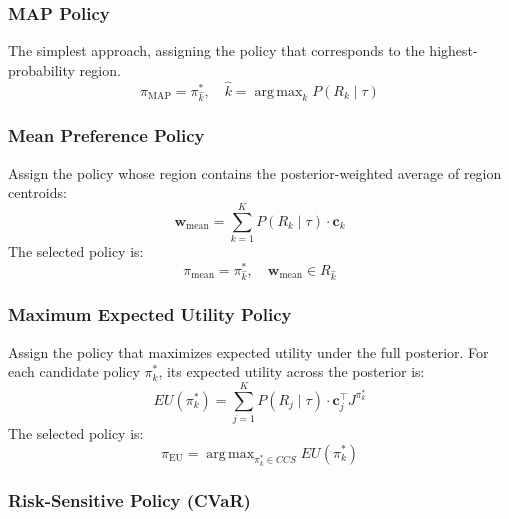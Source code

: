 \documentclass[11pt]{article}
\DeclareMathOperator*{\argmax}{arg\,max}
\begin{document}

\subsubsection{MAP Policy}
 
The simplest approach, assigning the policy that corresponds to the highest-probability region.
\begin{equation}
    \pi_{\text{MAP}} = \pi^*_{\hat{k}}, \quad \hat{k} = \argmax_k P(R_k \mid \tau)
\end{equation}

\subsubsection{Mean Preference Policy}

Assign the policy whose region contains the posterior-weighted average of region centroids:
\begin{equation}
    \mathbf{w}_{\text{mean}} = \sum_{k=1}^{K} P(R_k \mid \tau) \cdot \mathbf{c}_k
\end{equation}
The selected policy is:
\begin{equation}
    \pi_{\text{mean}} = \pi^*_{\hat{k}}, \quad \mathbf{w}_{\text{mean}} \in R_{\hat{k}}
\end{equation}
 
\subsubsection{Maximum Expected Utility Policy}
 
Assign the policy that maximizes expected utility under the full posterior. For each candidate policy $\pi^*_k$, its expected utility across the posterior is:
\begin{equation}
    EU(\pi^*_k) = \sum_{j=1}^{K} P(R_j \mid \tau) \cdot \mathbf{c}_j^\top J^{\pi^*_k}
\end{equation}
The selected policy is:
\begin{equation}
    \pi_{\text{EU}} = \argmax_{\pi^*_k \in CCS} EU(\pi^*_k)
\end{equation}
 
\subsubsection{Risk-Sensitive Policy (CVaR)}
\end{document}

